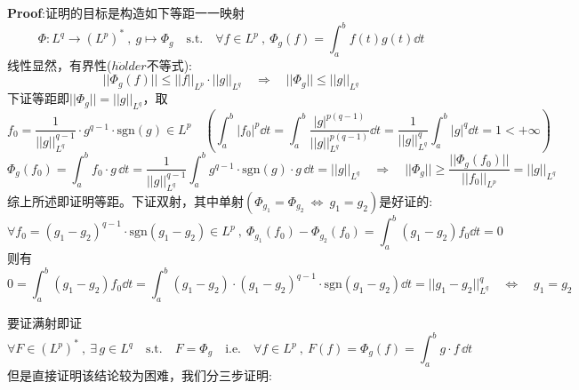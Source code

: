 \textbf{Proof}:证明的目标是构造如下等距一一映射
\[\Phi:L^q \to (L^p)^* \ , \ g \mapsto \Phi_g \quad \text{s.t.} \quad \forall f \in L^p \ , \ \Phi_g(f)=\int_a^bf(t)g(t) \dd t\]
线性显然，有界性($h\ddot{o}lder$不等式):
\[||\Phi_g(f)|| \leq ||f||_{L^p} \cdot ||g||_{L^q} \quad \Rightarrow \quad ||\Phi_g|| \leq ||g||_{L^q}\]
下证等距即$||\Phi_g||=||g||_{L^q}$，取
\[f_0=\frac{1}{||g||_{L^q}^{q-1}} \cdot g^{q-1} \cdot \text{sgn}(g) \in L^p \quad (\int_a^b|f_0|^p \dd t=\int_a^b\frac{|g|^{p(q-1)}}{||g||_{L^q}^{p(q-1)}} \dd t=\frac{1}{||g||_{L^q}^q}\int_a^b|g|^q \dd t=1 < +\infty)\]
\[\Phi_g(f_0)=\int_a^bf_0 \cdot g \, \dd t=\frac{1}{||g||_{L^q}^{q-1}}\int_a^bg^{q-1} \cdot \text{sgn}(g) \cdot g \, \dd t=||g||_{L^q} \quad \Rightarrow \quad ||\Phi_g|| \geq \frac{||\Phi_g(f_0)||}{||f_0||_{L^p}}=||g||_{L^q}\]
综上所述即证明等距。下证双射，其中单射$(\Phi_{g_1}=\Phi_{g_2} \ \Leftrightarrow \ g_1=g_2)$是好证的:
\[\forall f_0=(g_1-g_2)^{q-1} \cdot \text{sgn}(g_1-g_2) \in L^p \ , \ \Phi_{g_1}(f_0)-\Phi_{g_2}(f_0)=\int_a^b(g_1-g_2)f_0 \dd t=0\]
则有
\[0=\int_a^b(g_1-g_2)f_0 \dd t=\int_a^b(g_1-g_2) \cdot (g_1-g_2)^{q-1} \cdot \text{sgn}(g_1-g_2) \dd t=||g_1-g_2||_{L^q}^q \quad \Leftrightarrow \quad g_1=g_2\]

要证满射即证
\[\forall F \in (L^p)^* \ , \ \exists \, g \in L^q \quad \text{s.t.} \quad F=\Phi_g \quad \text{i.e.} \quad \forall f \in L^p \ , \ F(f)=\Phi_g(f)=\int_a^bg \cdot f \, \dd t\]
但是直接证明该结论较为困难，我们分三步证明:

